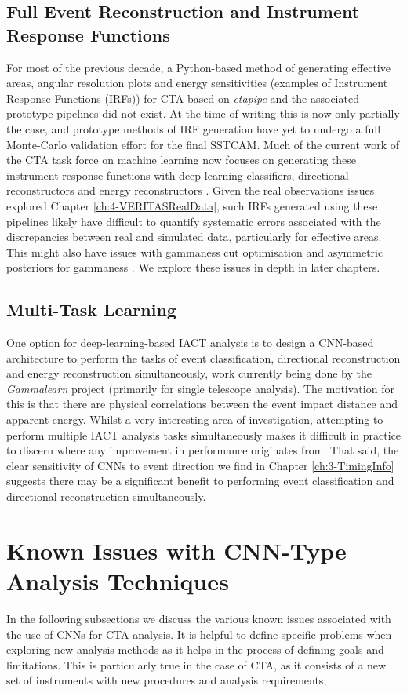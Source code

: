 \subsection{Full Event Reconstruction and Instrument Response Functions}
For most of the previous decade, a Python-based method of generating effective areas, angular resolution plots and energy sensitivities (examples of Instrument Response Functions (IRFs)) for CTA based on \textit{ctapipe} and the associated prototype pipelines did not exist. At the time of writing this is now only partially the case, and prototype methods of IRF generation have yet to undergo a full Monte-Carlo validation effort for the final SSTCAM. Much of the current work of the CTA task force on machine learning now focuses on generating these instrument response functions with deep learning classifiers, directional reconstructors and energy reconstructors \cite{tjarkicrc}. Given the real observations issues explored Chapter \ref{ch:4-VERITASRealData}, such IRFs generated using these pipelines likely have difficult to quantify systematic errors associated with the discrepancies between real and simulated data, particularly for effective areas. This might also have issues with gammaness cut optimisation and asymmetric posteriors for gammaness \cite{mike}. We explore these issues in depth in later chapters.

\subsection{Multi-Task Learning}

One option for deep-learning-based IACT analysis is to design a CNN-based architecture to perform the tasks of event classification, directional reconstruction and energy reconstruction simultaneously, work currently being done by the \textit{Gammalearn} project \cite{mikaelphd} (primarily for single telescope analysis). The motivation for this is that there are physical correlations between the event impact distance and apparent energy. Whilst a very interesting area of investigation, attempting to perform multiple IACT analysis tasks simultaneously makes it difficult in practice to discern where any improvement in performance originates from. That said, the clear sensitivity of CNNs to event direction we find in Chapter \ref{ch:3-TimingInfo} suggests there may be a significant benefit to performing event classification and directional reconstruction simultaneously.

\section{Known Issues with CNN-Type Analysis Techniques}
In the following subsections we discuss the various known issues associated with the use of CNNs for CTA analysis. It is helpful to define specific problems when exploring new analysis methods as it helps in the process of defining goals and limitations. This is particularly true in the case of CTA, as it consists of a new set of instruments with new procedures and analysis requirements,

